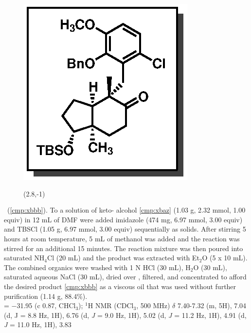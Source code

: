 \vspace{10pt}
\begin{figure}
  \vspace{-25pt}
  \begin{center}
    \includegraphics[scale=0.8]{chp_singlecarbon/images/xbbb}
    \begin{textblock}{1}(2.8,-1)  \end{textblock}
  \end{center}
  \vspace{-30pt}
\end{figure}\noindent \textbf{\CMPxbbb}\ (\ref{cmp:xbbb}).  To a solution of keto-
alcohol \ref{cmp:xbaz} (1.03 g, 2.32 mmol, 1.00 equiv) in 12 mL of DMF were
added imidazole (474 mg, 6.97 mmol, 3.00 equiv) and TBSCl (1.05 g, 6.97
mmol, 3.00 equiv) sequentially as solids. After stirring 5 hours at room
temperature, 5 mL of methanol was added and the reaction was stirred for
an additional 15 minutes. The reaction mixture was then poured into saturated NH$_4$Cl (20 mL)
and the product was extracted with Et$_2$O (5 x 10 mL). The combined organics were washed with
1 N HCl (30 mL), H$_2$O (30 mL), saturated aqueous NaCl (30 mL), dried over , filtered,
and concentrated to afford the desired product \ref{cmp:xbbb} as a viscous oil that was used without
further purification (1.14 g, 88.4\%). \\
\rotation = $-$31.95 (c 0.87, CHCl$_3$); $^1$H NMR (CDCl$_3$, 500 MHz) $\delta$ 7.40-7.32 (m, 5H), 7.04 (d, J =
8.8 Hz, 1H), 6.76 (d, \textit{J} = 9.0 Hz, 1H), 5.02 (d, \textit{J} = 11.2 Hz, 1H), 4.91 (d, \textit{J} = 11.0 Hz, 1H), 3.83
